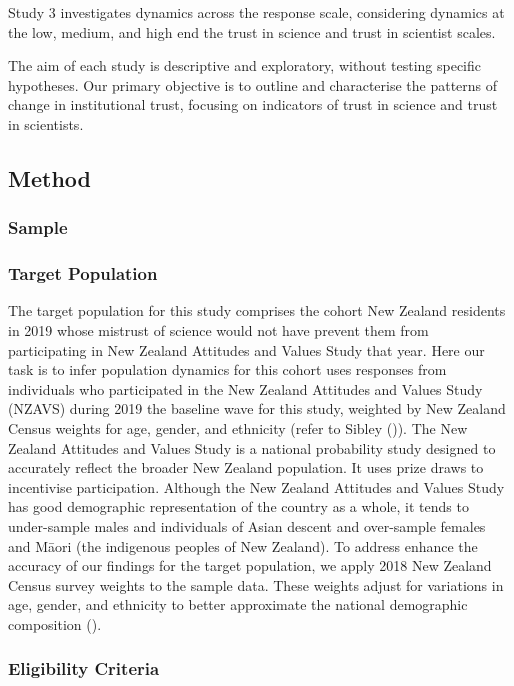 \documentclass[
  single column]{article}
\begin{document}
Study 3 investigates dynamics across the response scale, considering
dynamics at the low, medium, and high end the trust in science and trust
in scientist scales.

The aim of each study is descriptive and exploratory, without testing
specific hypotheses. Our primary objective is to outline and
characterise the patterns of change in institutional trust, focusing on
indicators of trust in science and trust in scientists.

\subsection{Method}\label{method}

\subsubsection{Sample}\label{sample}

\subsubsection{Target Population}\label{target-population}

The target population for this study comprises the cohort New Zealand
residents in 2019 whose mistrust of science would not have prevent them
from participating in New Zealand Attitudes and Values Study that year.
Here our task is to infer population dynamics for this cohort uses
responses from individuals who participated in the New Zealand Attitudes
and Values Study (NZAVS) during 2019 the baseline wave for this study,
weighted by New Zealand Census weights for age, gender, and ethnicity
(refer to Sibley ()). The New Zealand
Attitudes and Values Study is a national probability study designed to
accurately reflect the broader New Zealand population. It uses prize
draws to incentivise participation. Although the New Zealand Attitudes
and Values Study has good demographic representation of the country as a
whole, it tends to under-sample males and individuals of Asian descent
and over-sample females and Māori (the indigenous peoples of New
Zealand). To address enhance the accuracy of our findings for the target
population, we apply 2018 New Zealand Census survey weights to the
sample data. These weights adjust for variations in age, gender, and
ethnicity to better approximate the national demographic composition
().

\subsubsection{Eligibility Criteria}\label{eligibility-criteria}
\end{document}
